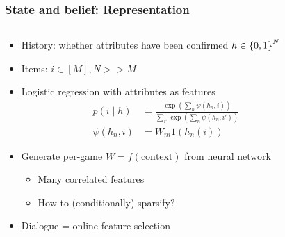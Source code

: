 \documentclass{beamer}
\begin{document}
\begin{frame}
\frametitle{State and belief: Representation}
\begin{columns}
\begin{column}{0.70\textwidth}
\begin{itemize}
\item History: whether attributes have been confirmed $h \in \left\{0,1\right\}^N$
\item Items: $i \in [M], N >> M$
\item Logistic regression with attributes as features
\begin{align*}
p(i \mid h) &= \frac{\exp(\sum_n \psi(h_n, i))}{\sum_{i'} \exp(\sum_n\psi(h_n, i'))}\\
\psi(h_n, i) &= W_{ni} 1(h_n(i))
\end{align*}
\item Generate per-game $W = f(\text{context})$ from neural network
    \begin{itemize}
    \item Many correlated features
    \item How to (conditionally) sparsify?
    \end{itemize}
\item Dialogue = online feature selection
\end{itemize}
\end{column}
\begin{column}{0.30\textwidth}
\centering
{}
\end{column}
\end{columns}
\end{frame}
\end{document}
